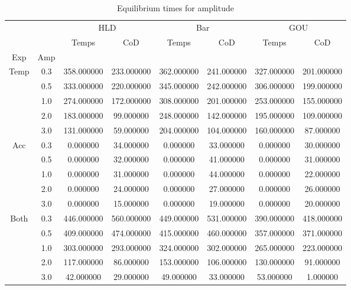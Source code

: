 \begin{table}[h]
\centering
\caption{Equilibrium times for amplitude}
\label{table:5}
\begin{tabular}{cccccccc}
\toprule
{} & {} & \multicolumn{2}{c}{HLD} & \multicolumn{2}{c}{Bar} & \multicolumn{2}{c}{GOU} \\
{} & {} & {Temps} & {CoD} & {Temps} & {CoD} & {Temps} & {CoD} \\
{Exp} & {Amp} & {} & {} & {} & {} & {} & {} \\
\midrule
\multirow[c]{5}{*}{Temp} & 0.3 & 358.000000 & 233.000000 & 362.000000 & 241.000000 & 327.000000 & 201.000000 \\
 & 0.5 & 333.000000 & 220.000000 & 345.000000 & 242.000000 & 306.000000 & 199.000000 \\
 & 1.0 & 274.000000 & 172.000000 & 308.000000 & 201.000000 & 253.000000 & 155.000000 \\
 & 2.0 & 183.000000 & 99.000000 & 248.000000 & 142.000000 & 195.000000 & 109.000000 \\
 & 3.0 & 131.000000 & 59.000000 & 204.000000 & 104.000000 & 160.000000 & 87.000000 \\
\multirow[c]{5}{*}{Acc} & 0.3 & 0.000000 & 34.000000 & 0.000000 & 33.000000 & 0.000000 & 30.000000 \\
 & 0.5 & 0.000000 & 32.000000 & 0.000000 & 41.000000 & 0.000000 & 31.000000 \\
 & 1.0 & 0.000000 & 31.000000 & 0.000000 & 44.000000 & 0.000000 & 22.000000 \\
 & 2.0 & 0.000000 & 24.000000 & 0.000000 & 27.000000 & 0.000000 & 26.000000 \\
 & 3.0 & 0.000000 & 15.000000 & 0.000000 & 19.000000 & 0.000000 & 20.000000 \\
\multirow[c]{5}{*}{Both} & 0.3 & 446.000000 & 560.000000 & 449.000000 & 531.000000 & 390.000000 & 418.000000 \\
 & 0.5 & 409.000000 & 474.000000 & 415.000000 & 460.000000 & 357.000000 & 371.000000 \\
 & 1.0 & 303.000000 & 293.000000 & 324.000000 & 302.000000 & 265.000000 & 223.000000 \\
 & 2.0 & 117.000000 & 86.000000 & 153.000000 & 106.000000 & 130.000000 & 91.000000 \\
 & 3.0 & 42.000000 & 29.000000 & 49.000000 & 33.000000 & 53.000000 & 1.000000 \\
\bottomrule
\end{tabular}
\end{table}
